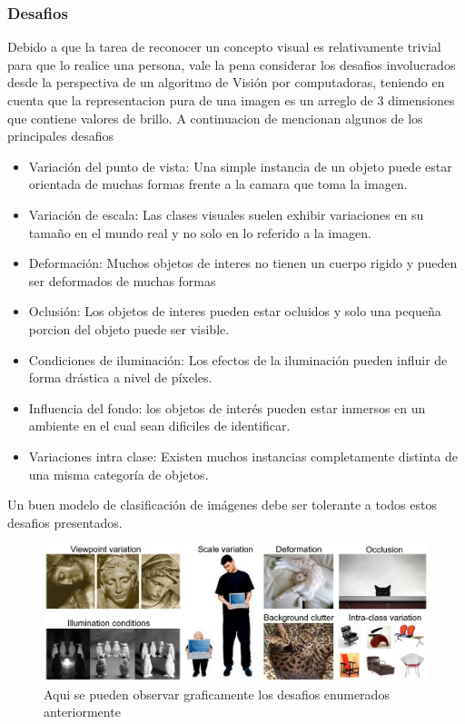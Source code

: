 \documentclass[a4paper,11pt,spanish]{book}
\begin{document}
	\subsubsection {Desafios}
	  Debido a que la tarea de reconocer un concepto visual es relativamente trivial para que lo realice una persona, vale la pena considerar los desafios involucrados desde la perspectiva de
	  un algoritmo de Visión por computadoras, teniendo en cuenta que la representacion pura de una imagen es un arreglo de 3 dimensiones que contiene valores de brillo. A continuacion de mencionan
	  algunos de los principales desafios
	  \begin{itemize}
	    \item Variación del punto de vista: Una simple instancia de un objeto puede estar orientada de muchas formas frente a la camara que toma la imagen.
	    \item Variación de escala: Las clases visuales suelen exhibir variaciones en su tamaño en el mundo real y no solo en lo referido a la imagen.
	    \item Deformación: Muchos objetos de interes no tienen un cuerpo rigido y pueden ser deformados de muchas formas
	    \item Oclusión: Los objetos de interes pueden estar ocluidos y solo una pequeña porcion del objeto puede ser visible.
	    \item Condiciones de iluminación: Los efectos de la iluminación pueden influir de forma drástica a nivel de píxeles.
	    \item Influencia del fondo: los objetos de interés pueden estar inmersos en un ambiente en el cual sean dificiles de identificar.
	    \item Variaciones intra clase: Existen muchos instancias completamente distinta de una misma categoría de objetos.
	  \end{itemize}
	  Un buen modelo de clasificación de imágenes debe ser tolerante a todos estos desafios presentados.
	  \begin{figure}[h]
	    \includegraphics[scale=0.5]{./img/stanford_challenges.jpeg}
	    \caption{Aqui se pueden observar graficamente los desafios enumerados anteriormente}
	    \label{fig:stanford_challenges}
	  \end{figure}
\end{document}

